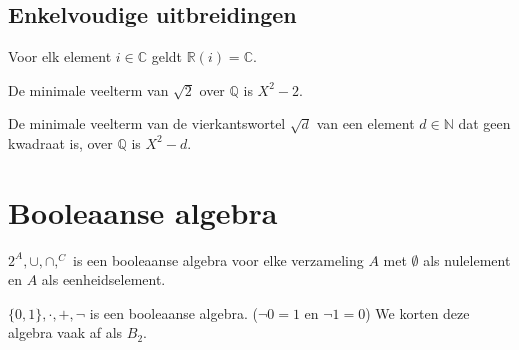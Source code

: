 \documentclass[main.tex]{subfiles}
\begin{document}
\subsection{Enkelvoudige uitbreidingen}

\begin{vb}
  Voor elk element $i\in \mathbb{C}$ geldt $\mathbb{R}(i) = \mathbb{C}$.
\end{vb}

\begin{vb}
  De minimale veelterm van $\sqrt{2}$ over $\mathbb{Q}$ is $X^{2}-2$.
\end{vb}

\begin{vb}
  De minimale veelterm van de vierkantswortel $\sqrt{d}$ van een element $d\in \mathbb{N}$ dat geen kwadraat is, over $\mathbb{Q}$ is $X^{2}-d$.
\end{vb}

\section{Booleaanse algebra}
\label{sec:booleaanse-algebra}

\begin{vb}
  $2^{A},\cup,\cap,^{C}$ is een booleaanse algebra voor elke verzameling $A$ met $\emptyset$ als nulelement en $A$ als eenheidselement.
\end{vb}

\begin{vb}
  $\{0,1\},\cdot,+,\neg$ is een booleaanse algebra. ($\neg 0 = 1$ en $\neg 1 = 0$)
  We korten deze algebra vaak af als $B_{2}$.
\end{vb}    
\end{document}
